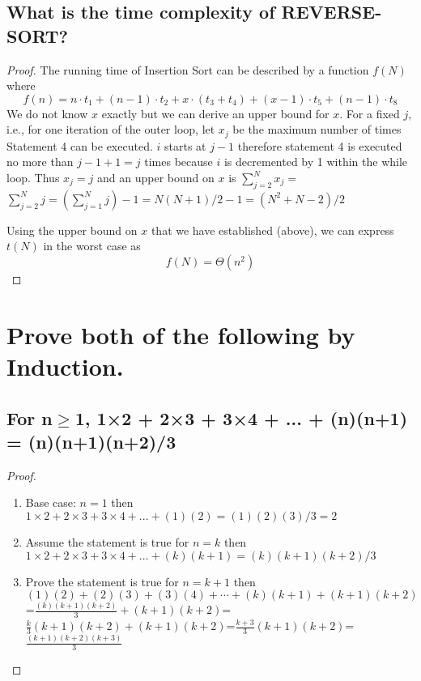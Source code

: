\documentclass[a4paper]{article}
\begin{document}
\subsection{What is the time complexity of REVERSE-SORT?}
\begin{proof}
The running time of Insertion Sort can be described by a function $f(N)$ where
$$
f(n)=n \cdot t_1+(n-1) \cdot t_2+x \cdot (t_3+t_4)+(x-1) \cdot t_5+(n-1)\cdot t_8
$$
We do not know $x$ exactly but we can derive an upper bound for $x$. For a fixed $j$, i.e., for one iteration of the outer loop, let $x_j$ be the maximum number of times Statement 4 can be executed. $i$ starts at $j-1$ therefore statement 4 is executed no more than $j-1+1=j$ times because $i$ is decremented by 1 within the while loop. Thus $x_j=j$ and an upper bound on $x$ is $\sum_{j=2}^N x_j=$ $\sum_{j=2}^N j=\left(\sum_{j=1}^N j\right)-1=N(N+1) / 2-1=\left(N^2+N-2\right) / 2$

Using the upper bound on $x$ that we have established (above), we can express $t(N)$ in the worst case as
$$
f(N)=\Theta (n^2)
$$
     
\end{proof}
\section{Prove both of the following by Induction. }
\subsection{ For n$\geq$1, 1×2 + 2×3 + 3×4 + ... + (n)(n+1)  =  (n)(n+1)(n+2)/3}
\begin{proof}
    \begin{enumerate}
        \item Base case: $n=1$ then $1×2 + 2×3 + 3×4 + ... + (1)(2)  =  (1)(2)(3)/3=2$
        \item Assume the statement is true for $n=k$ then $1×2 + 2×3 + 3×4 + ... + (k)(k+1)  =  (k)(k+1)(k+2)/3$
        \item Prove the statement is true for $n=k+1$ then $(1)(2)+(2)(3)+(3)(4)+\cdots+(k)(k+1)+(k+1)(k+2)$=$\frac{(k)(k+1)(k+2)}{3}+(k+1)(k+2)$=$\frac{k}{3}(k+1)(k+2)+(k+1)(k+2)$=$\frac{k+3}{3}(k+1)(k+2)$=$\frac{(k+1)(k+2)(k+3)}{3}$
    \end{enumerate}

\end{proof}
\end{document}
